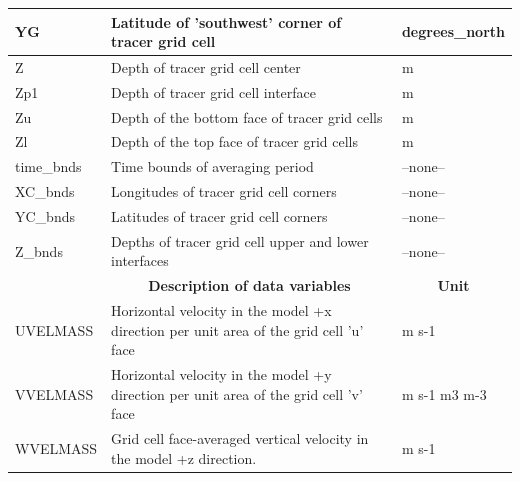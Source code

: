 \begin{longtable}{|m{}|m{}|m{}|}
YG &Latitude of 'southwest' corner of tracer grid cell &degrees\_north  \\ \hline
Z &Depth of tracer grid cell center &m  \\ \hline
Zp1 &Depth of tracer grid cell interface &m  \\ \hline
Zu &Depth of the bottom face of tracer grid cells &m  \\ \hline
Zl &Depth of the top face of tracer grid cells &m  \\ \hline
time\_bnds &Time bounds of averaging period &--none--  \\ \hline
XC\_bnds &Longitudes of tracer grid cell corners &--none--  \\ \hline
YC\_bnds &Latitudes of tracer grid cell corners &--none--  \\ \hline
Z\_bnds &Depths of tracer grid cell upper and lower interfaces &--none--  \\ \hline
\rowcolor{lightgray} \multicolumn{1}{|c|}{\textbf{Variables}} & \multicolumn{1}{|c|}{\textbf{Description of data variables}} &  \multicolumn{1}{|c|}{\textbf{Unit}}\\ \hline
UVELMASS &Horizontal velocity in the model +x direction per unit area of the grid cell 'u' face &m s-1  \\ \hline
VVELMASS &Horizontal velocity in the model +y direction per unit area of the grid cell 'v' face &m s-1 m3 m-3  \\ \hline
WVELMASS &Grid cell face-averaged vertical velocity in the model +z direction. &m s-1  \\ \hline
\end{longtable}

\newp
\pagebreak
